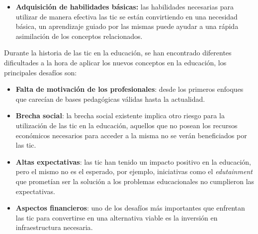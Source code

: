 \begin{itemize}
\item \textbf{Adquisición de habilidades básicas:} las habilidades necesarias para
    utilizar de manera efectiva las \Gls{tic} se están convirtiendo en una
    necesidad básica, un aprendizaje guiado por las mismas puede ayudar a una
    rápida asimilación de los conceptos relacionados\cite{martin2008modelo}.

\end{itemize}

Durante la historia de las \Gls{tic} en la educación, se han encontrado
diferentes dificultades a la hora de aplicar los nuevos conceptos en la
educación, los principales desafíos son:

\begin{itemize}

\item \textbf{Falta de motivación de los profesionales}: desde los primeros
    enfoques que carecían de bases pedagógicas válidas hasta la
    actualidad\cite{punie:ict,ict:romeo}.

\item \textbf{Brecha social}: la brecha social existente implica otro riesgo
    para la utilización de las \Gls{tic} en la educación, aquellos que no posean
    los recursos económicos necesarios para acceder a la misma no se verán
    beneficiados por las \Gls{tic}\cite{punie:ict}.

\item \textbf{Altas expectativas}: las \Gls{tic} han tenido un impacto positivo
    en la educación, pero el mismo no es el esperado\cite{punie:ict}, por
    ejemplo, iniciativas como el \emph{edutainment} que prometían ser la
    solución a los problemas educacionales no cumplieron las expectativas. 

\item \textbf{Aspectos financieros}: uno de los desafíos más importantes que
    enfrentan las \Gls{tic} para convertirse en una alternativa viable es la
    inversión en infraestructura necesaria\cite{unesco:ict}.

\end{itemize}

